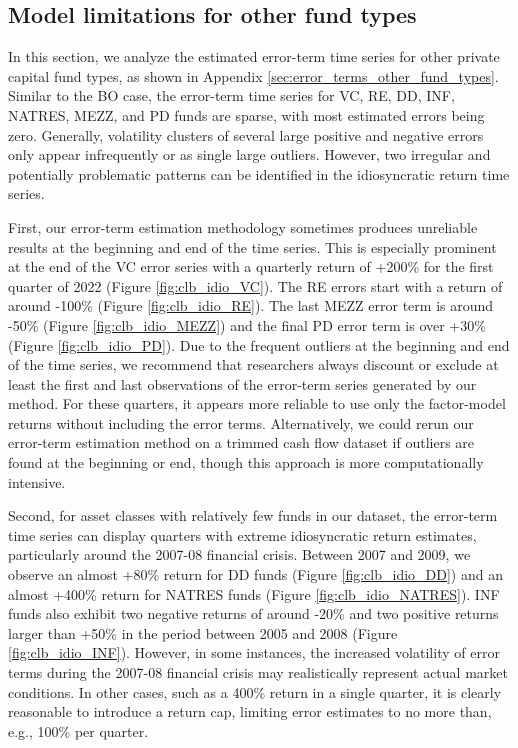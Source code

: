 \documentclass[12pt]{article}
\begin{document}
\subsection{Model limitations for other fund types}

In this section, we analyze the estimated error-term time series for other private capital fund types, as shown in Appendix \ref{sec:error_terms_other_fund_types}.
Similar to the BO case, the error-term time series for VC, RE, DD, INF, NATRES, MEZZ, and PD funds are sparse, with most estimated errors being zero. 
Generally, volatility clusters of several large positive and negative errors only appear infrequently or as single large outliers. 
However, two irregular and potentially problematic patterns can be identified in the idiosyncratic return time series.

First, our error-term estimation methodology sometimes produces unreliable results at the beginning and end of the time series.
This is especially prominent at the end of the VC error series with a quarterly return of +200\% for the first quarter of 2022 (Figure \ref{fig:clb_idio_VC}). 
The RE errors start with a return of around -100\% (Figure \ref{fig:clb_idio_RE}).
The last MEZZ error term is around -50\% (Figure \ref{fig:clb_idio_MEZZ}) and the final PD error term is over +30\% (Figure \ref{fig:clb_idio_PD}).
Due to the frequent outliers at the beginning and end of the time series, we recommend that researchers always discount or exclude at least the first and last observations of the error-term series generated by our method. 
For these quarters, it appears more reliable to use only the factor-model returns without including the error terms.
Alternatively, we could rerun our error-term estimation method on a trimmed cash flow dataset if outliers are found at the beginning or end, though this approach is more computationally intensive.

Second, for asset classes with relatively few funds in our dataset, the error-term time series can display quarters with extreme idiosyncratic return estimates, particularly around the 2007-08 financial crisis.
Between 2007 and 2009, we observe an almost +80\% return for DD funds (Figure \ref{fig:clb_idio_DD}) and an almost +400\% return for NATRES funds (Figure \ref{fig:clb_idio_NATRES}).
INF funds also exhibit two negative returns of around -20\% and two positive returns larger than +50\% in the period between 2005 and 2008 (Figure \ref{fig:clb_idio_INF}).
However, in some instances, the increased volatility of error terms during the 2007-08 financial crisis may realistically represent actual market conditions. 
In other cases, such as a 400\% return in a single quarter, it is clearly reasonable to introduce a return cap, limiting error estimates to no more than, e.g., 100\% per quarter.
\end{document}

